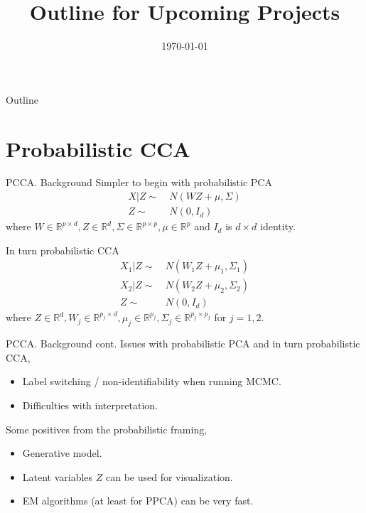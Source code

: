 \documentclass{beamer}
\author{}
\title{Outline for Upcoming Projects}
\date{\today}
\newcommand{\R}{\mathbb{R}}
\newcommand{\vs}[1]{
    \vspace{#1pt}

}
\begin{document}
\maketitle

\begin{frame}{Outline}
    \tableofcontents
\end{frame}

\section{Probabilistic CCA}
\begin{frame}{PCCA. Background}
Simpler to begin with probabilistic PCA
\begin{equation}
\begin{aligned}
    X | Z \sim &\ N(WZ + \mu, \Sigma) \\
    Z \sim &\ N(0, I_{d})
\end{aligned}
\end{equation}
where $W \in \R^{p \times d}, Z \in \R^{d}, \Sigma \in \R^{p \times p}, \mu \in \R^{p}$ and $I_d$ is $d \times d$ identity.
\vs{10}
In turn probabilistic CCA
\begin{equation}
\begin{aligned}
    X_1 | Z \sim &\ N(W_1 Z + \mu_1, \Sigma_1) \\
    X_2 | Z \sim &\ N(W_2 Z + \mu_2, \Sigma_2) \\
    Z \sim &\ N(0, I_d) 
\end{aligned}
\end{equation}
where $Z \in \R^{d}, W_j \in \R^{p_j \times d}, \mu_j \in \R^{p_j}, \Sigma_j \in \R^{p_j \times p_j}$ for $j=1,2$.
\end{frame}

\begin{frame}{PCCA. Background cont.}
Issues with probabilistic PCA and in turn probabilistic CCA,
\begin{itemize}
    \item Label switching / non-identifiability when running MCMC.
    \item Difficulties with interpretation.
\end{itemize}
\vs{10}
Some positives from the probabilistic framing,
\begin{itemize}
    \item Generative model.
    \item Latent variables $Z$ can be used for visualization.
    \item EM algorithms (at least for PPCA) can be very fast.
\end{itemize}
\end{frame}
\end{document}

